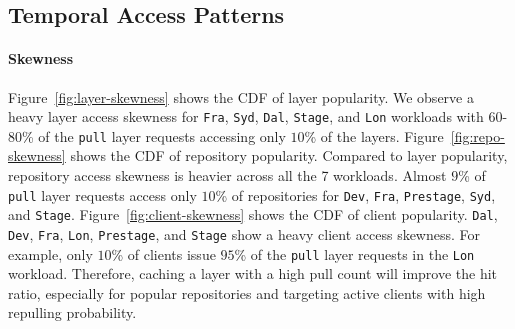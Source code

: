 \subsection{Temporal Access Patterns}



\paragraph{Skewness}
Figure~\ref{fig:layer-skewness} shows the CDF of layer popularity.
We observe a heavy layer access skewness for \texttt{Fra}, \texttt{Syd}, \texttt{Dal}, \texttt{Stage}, and \texttt{Lon} workloads with $60$-$80$\%  of the \texttt{pull} layer requests accessing only $10$\% of the layers.
Figure~\ref{fig:repo-skewness} shows the CDF of repository popularity.
Compared to layer popularity, 
repository access skewness is heavier across all the 7 workloads.
Almost $9$\% of \texttt{pull} layer requests access only $10$\% of repositories for 
\texttt{Dev}, \texttt{Fra}, \texttt{Prestage}, \texttt{Syd}, and \texttt{Stage}.
Figure~\ref{fig:client-skewness} shows the CDF of client popularity.
\texttt{Dal}, \texttt{Dev}, \texttt{Fra}, \texttt{Lon}, \texttt{Prestage}, and \texttt{Stage} show a heavy client access skewness. 
For example, only $10$\% of clients issue $95$\% of the \texttt{pull} layer requests in the \texttt{Lon} workload.
Therefore, caching a layer with a high pull count will improve the hit ratio, 
especially for popular repositories and targeting active clients with high repulling probability.

